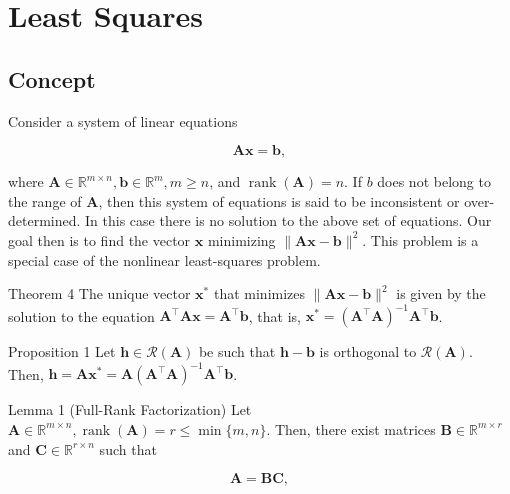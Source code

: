 \section{Least Squares}

\subsection{Concept}
Consider a system of linear equations

\[
	\boldsymbol{A} \boldsymbol{x}=\boldsymbol{b},
\]

where \(\boldsymbol{A} \in \mathbb{R}^{m \times n}, \boldsymbol{b} \in \mathbb{R}^{m}, m \geq n\), and \(\operatorname{rank}(\boldsymbol{A})=n\). If \(b\) does not belong to the range of \(\boldsymbol{A}\), then this system of equations is said to be inconsistent or over-determined. In this case there is no solution to the above set of equations. Our goal then is to find the vector \(\boldsymbol{x}\) minimizing \(\|\boldsymbol{A} \boldsymbol{x}-\boldsymbol{b}\|^{2}\). This problem is a special case of the nonlinear least-squares problem.

Theorem 4 The unique vector \(\boldsymbol{x}^{*}\) that minimizes \(\|\boldsymbol{A} \boldsymbol{x}-\boldsymbol{b}\|^{2}\) is given by the solution to the equation \(\boldsymbol{A}^{\top} \boldsymbol{A} \boldsymbol{x}=\boldsymbol{A}^{\top} \boldsymbol{b}\), that is, \(\boldsymbol{x}^{*}=\left(\boldsymbol{A}^{\top} \boldsymbol{A}\right)^{-1} \boldsymbol{A}^{\top} \boldsymbol{b}\).

Proposition 1 Let \(\boldsymbol{h} \in \mathcal{R}(\boldsymbol{A})\) be such that \(\boldsymbol{h}-\boldsymbol{b}\) is orthogonal to \(\mathcal{R}(\boldsymbol{A})\). Then, \(\boldsymbol{h}=\boldsymbol{A} \boldsymbol{x}^{*}=\boldsymbol{A}\left(\boldsymbol{A}^{\top} \boldsymbol{A}\right)^{-1} \boldsymbol{A}^{\top} \boldsymbol{b}\).

Lemma 1 (Full-Rank Factorization) Let \(\boldsymbol{A} \in \mathbb{R}^{m \times n}, \operatorname{rank}(\boldsymbol{A})=r \leq \min \{m, n\}\). Then, there exist matrices \(\boldsymbol{B} \in \mathbb{R}^{m \times r}\) and \(\boldsymbol{C} \in \mathbb{R}^{r \times n}\) such that

\[
	\boldsymbol{A}=\boldsymbol{B} \boldsymbol{C},
\]

